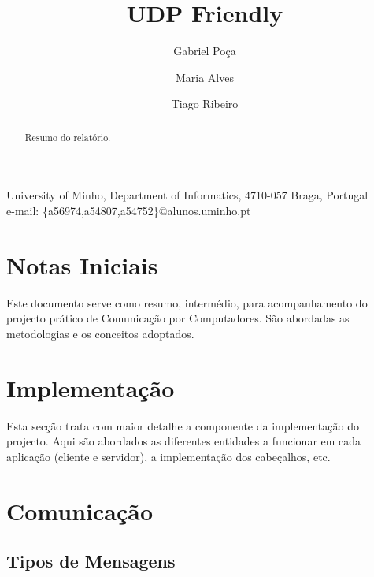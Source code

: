 \documentclass{article}
\begin{document}
\title{UDP Friendly}


\author{Gabriel Poça \and Maria Alves \and Tiago Ribeiro}



\date{}


\maketitle


\begin{center}\small{University of Minho, Department of  Informatics, 4710-057 Braga, Portugal\\
e-mail: \{a56974,a54807,a54752\}@alunos.uminho.pt}\end{center}


\begin{abstract}
Resumo do relatório.
\end{abstract}

\section{Notas Iniciais}
Este documento serve como resumo, intermédio, para acompanhamento do projecto prático de Comunicação por Computadores. São abordadas as metodologias e os conceitos adoptados.

\section{Implementação}
Esta secção trata com maior detalhe a componente da implementação do projecto. Aqui são abordados as diferentes entidades a funcionar em cada aplicação (cliente e servidor), a implementação dos cabeçalhos, etc.

\section{Comunicação}
\subsection{Tipos de Mensagens}
\end{document}
